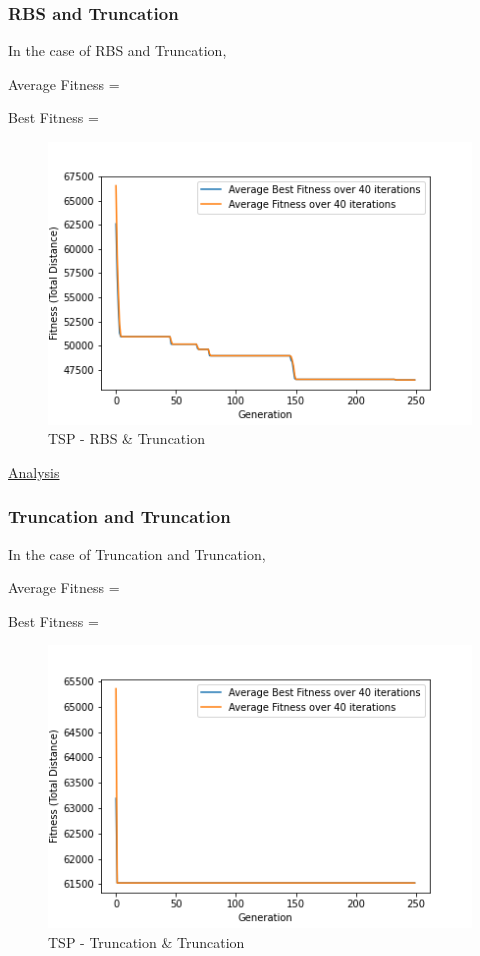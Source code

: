 \documentclass[11pt, letterpaper]{article}
\begin{document}
\subsubsection {RBS and Truncation}
In the case of RBS and Truncation,

Average Fitness = 

Best Fitness = 
\begin{figure}[h]
    \centering
    \includegraphics[scale = 0.6]{images/tsp_rb_tr.png}
    \caption {TSP - RBS \& Truncation}
    \label {fig:tpsBT}
\end{figure}

\underline{Analysis}

\subsubsection {Truncation and Truncation}
In the case of Truncation and Truncation,

Average Fitness = 

Best Fitness = 
\begin{figure}[H]
    \centering
    \includegraphics[scale = 0.6]{images/tsp_tr_tr.png}
    \caption {TSP - Truncation \& Truncation}
    \label {fig:tpsTT}
\end{figure}
\end{document}
